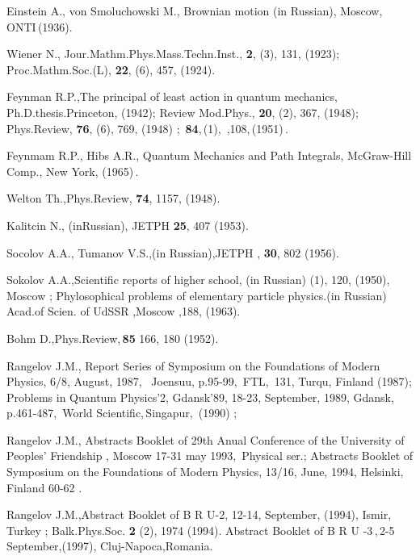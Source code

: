 \documentclass[12pt]{article}
\begin{document}
\begin{thebibliography}{99}
 Einstein A., von Smoluchowski M., Brownian motion (in Russian),
Moscow,\,ONTI\,(1936).

 Wiener N., Jour.Mathm.Phys.Mass.Techn.Inst., {\bf 2}, (3), 131,
(1923); Proc.Mathm.Soc.(L), {\bf 22}, (6), 457, (1924).

 Feynman R.P.,The principal of least action in quantum mechanics,
Ph.D.thesis.Princeton, (1942);  Review Mod.Phys., {\bf 20}, (2),
367, (1948); \,Phys.Review, {\bf 76}, (6), 769, (1948) ;
\,{\bf 84},\,(1),\ ,108,\,(1951)\,.

 Feynmam R.P., Hibs A.R., Quantum Mechanics and Path Integrals,
McGraw-Hill Comp., New York, (1965)\,.

 Welton Th.,Phys.Review, {\bf 74}, 1157, (1948).

 Kalitcin N., (inRussian), JETPH {\bf 25}, 407 (1953).

 Socolov A.A., Tumanov V.S.,(in Russian),JETPH , {\bf 30},
 802 (1956).

 Sokolov A.A.,Scientific reports of higher school, (in Russian)
(1), 120, (1950), Moscow ; Phylosophical problems of elementary particle
physics.(in Russian) \, Acad.of Scien. of UdSSR ,Moscow ,188, (1963).

 Bohm D.,Phys.Review,\,{\bf 85} 166, 180 (1952).

 Rangelov J.M., Report Series of Symposium on the Foundations
of Modern Physics, 6/8, August, 1987, \, Joensuu, p.95-99,\, FTL,\, 131,
Turqu, Finland (1987); Problems in Quantum Physics'2, Gdansk'89, 18-23,
September, 1989, Gdansk, p.461-487,\, World Scientific,\,Singapur,\, (1990) ;

 Rangelov J.M., Abstracts Booklet of 29th Anual Conference of
the University of Peoples' Friendship , Moscow 17-31 may 1993, \,Physical
ser.;  Abstracts Booklet of Symposium on the Foundations of Modern Physics,
13/16, June, 1994, Helsinki, Finland 60-62 .

 Rangelov J.M.,Abstract Booklet of B R U-2, 12-14, September,
(1994), Ismir, Turkey ; Balk.Phys.Soc. {\bf 2} (2), 1974 (1994). Abstract
Booklet of B R U -3\,,\,2-5 September,(1997), Cluj-Napoca,Romania.

\end{thebibliography}
\end{document}
